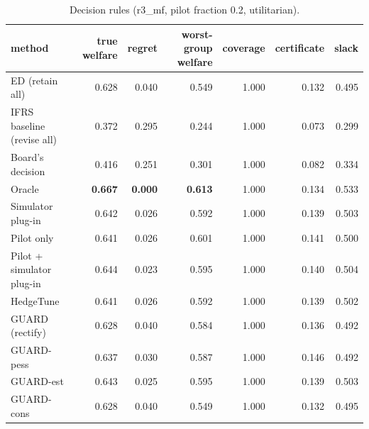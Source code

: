 \begin{table}[t]
\centering
\small
\begin{tabular}{lrrrrrr}
\toprule
method & true welfare & regret & worst-group welfare & coverage & certificate & slack \\
\midrule
ED (retain all) & 0.628 & 0.040 & 0.549 & 1.000 & 0.132 & 0.495 \\
IFRS baseline (revise all) & 0.372 & 0.295 & 0.244 & 1.000 & 0.073 & 0.299 \\
Board's decision & 0.416 & 0.251 & 0.301 & 1.000 & 0.082 & 0.334 \\
Oracle & \textbf{0.667} & \textbf{0.000} & \textbf{0.613} & 1.000 & 0.134 & 0.533 \\
Simulator plug-in & 0.642 & 0.026 & 0.592 & 1.000 & 0.139 & 0.503 \\
Pilot only & 0.641 & 0.026 & 0.601 & 1.000 & 0.141 & 0.500 \\
Pilot + simulator plug-in & 0.644 & 0.023 & 0.595 & 1.000 & 0.140 & 0.504 \\
HedgeTune & 0.641 & 0.026 & 0.592 & 1.000 & 0.139 & 0.502 \\
GUARD (rectify) & 0.628 & 0.040 & 0.584 & 1.000 & 0.136 & 0.492 \\
GUARD-pess & 0.637 & 0.030 & 0.587 & 1.000 & 0.146 & 0.492 \\
GUARD-est & 0.643 & 0.025 & 0.595 & 1.000 & 0.139 & 0.503 \\
GUARD-cons & 0.628 & 0.040 & 0.549 & 1.000 & 0.132 & 0.495 \\
\bottomrule
\end{tabular}
\caption{Decision rules (r3\_mf, pilot fraction 0.2, utilitarian).}
\label{tab:methods-utilitarian}
\end{table}
